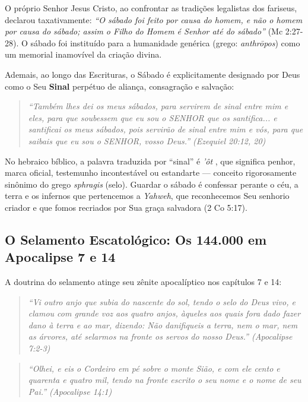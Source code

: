 O próprio Senhor Jesus Cristo, ao confrontar as tradições legalistas dos fariseus, declarou taxativamente: \textit{``O sábado foi feito por causa do homem, e não o homem por causa do sábado; assim o Filho do Homem é Senhor até do sábado''} (Mc 2:27-28). O sábado foi instituído para a humanidade genérica (grego: \textit{anthrōpos}) como um memorial inamovível da criação divina.

Ademais, ao longo das Escrituras, o Sábado é explicitamente designado por Deus como o Seu \textbf{Sinal} perpétuo de aliança, consagração e salvação:


\begin{quote}
\itshape \textit{``Também lhes dei os meus sábados, para servirem de sinal entre mim e eles, para que soubessem que eu sou o SENHOR que os santifica... e santificai os meus sábados, pois servirão de sinal entre mim e vós, para que saibais que eu sou o SENHOR, vosso Deus.''} (Ezequiel 20:12, 20)
\end{quote}


No hebraico bíblico, a palavra traduzida por ``sinal'' é \textit{'ôt} , que significa penhor, marca oficial, testemunho incontestável ou estandarte — conceito rigorosamente sinônimo do grego \textit{sphragis} (selo). Guardar o sábado é confessar perante o céu, a terra e os infernos que pertencemos a \textit{Yahweh}, que reconhecemos Seu senhorio criador e que fomos recriados por Sua graça salvadora (2 Co 5:17).



\subsection{O Selamento Escatológico: Os 144.000 em Apocalipse 7 e 14}


A doutrina do selamento atinge seu zênite apocalíptico nos capítulos 7 e 14:


\begin{quote}
\itshape \textit{``Vi outro anjo que subia do nascente do sol, tendo o selo do Deus vivo, e clamou com grande voz aos quatro anjos, àqueles aos quais fora dado fazer dano à terra e ao mar, dizendo: Não danifiqueis a terra, nem o mar, nem as árvores, até selarmos na fronte os servos do nosso Deus.''} (Apocalipse 7:2-3)
\end{quote}



\begin{quote}
\itshape \textit{``Olhei, e eis o Cordeiro em pé sobre o monte Sião, e com ele cento e quarenta e quatro mil, tendo na fronte escrito o seu nome e o nome de seu Pai.''} (Apocalipse 14:1)
\end{quote}


